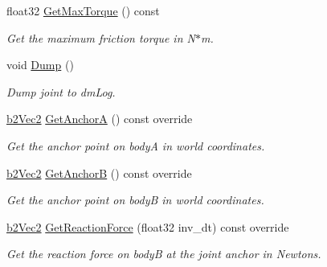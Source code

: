\begin{DoxyCompactItemize}
float32 \hyperlink{classb2FrictionJoint_ae926972faa5846436cbcfe5772adc1f6}{Get\+Max\+Torque} () const
\begin{DoxyCompactList}\small\item\em Get the maximum friction torque in N$\ast$m. \end{DoxyCompactList}\item 
\mbox{\label{classb2FrictionJoint_a9a27084c9f4a7ea0a4f590f687ac1edb}} 
void \hyperlink{classb2FrictionJoint_a9a27084c9f4a7ea0a4f590f687ac1edb}{Dump} ()
\begin{DoxyCompactList}\small\item\em Dump joint to dm\+Log. \end{DoxyCompactList}\item 
\mbox{\label{classb2FrictionJoint_a8e0bf2e9eba24f326d060789fedc7278}} 
\hyperlink{structb2Vec2}{b2\+Vec2} \hyperlink{classb2FrictionJoint_a8e0bf2e9eba24f326d060789fedc7278}{Get\+AnchorA} () const override
\begin{DoxyCompactList}\small\item\em Get the anchor point on bodyA in world coordinates. \end{DoxyCompactList}\item 
\mbox{\label{classb2FrictionJoint_af5a025b64221aafa98393d47d8414328}} 
\hyperlink{structb2Vec2}{b2\+Vec2} \hyperlink{classb2FrictionJoint_af5a025b64221aafa98393d47d8414328}{Get\+AnchorB} () const override
\begin{DoxyCompactList}\small\item\em Get the anchor point on bodyB in world coordinates. \end{DoxyCompactList}\item 
\mbox{\label{classb2FrictionJoint_a39d2c9ec06e6dd9733a8c4d72b4db2f0}} 
\hyperlink{structb2Vec2}{b2\+Vec2} \hyperlink{classb2FrictionJoint_a39d2c9ec06e6dd9733a8c4d72b4db2f0}{Get\+Reaction\+Force} (float32 inv\+\_\+dt) const override
\begin{DoxyCompactList}\small\item\em Get the reaction force on bodyB at the joint anchor in Newtons. \end{DoxyCompactList}\item 
\mbox{\label{classb2FrictionJoint_a0a51dfa3bbc85408b9ccd63664230c99}} 

\end{DoxyCompactItemize}
